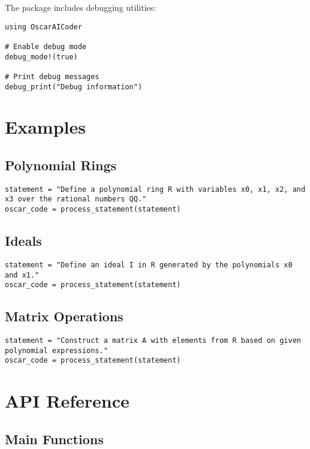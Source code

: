 \documentclass[11pt,a4paper]{article}
\begin{document}
The package includes debugging utilities:

\begin{lstlisting}
using OscarAICoder

# Enable debug mode
debug_mode!(true)

# Print debug messages
debug_print("Debug information")
\end{lstlisting}

\section{Examples}

\subsection{Polynomial Rings}

\begin{lstlisting}
statement = "Define a polynomial ring R with variables x0, x1, x2, and x3 over the rational numbers QQ."
oscar_code = process_statement(statement)
\end{lstlisting}

\subsection{Ideals}

\begin{lstlisting}
statement = "Define an ideal I in R generated by the polynomials x0 and x1."
oscar_code = process_statement(statement)
\end{lstlisting}

\subsection{Matrix Operations}

\begin{lstlisting}
statement = "Construct a matrix A with elements from R based on given polynomial expressions."
oscar_code = process_statement(statement)
\end{lstlisting}

\section{API Reference}

\subsection{Main Functions}
\end{document}
